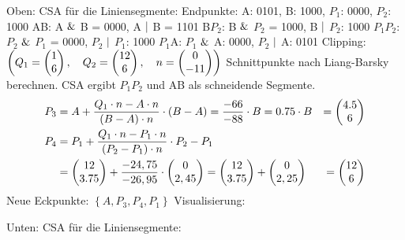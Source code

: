 \documentclass[a4paper,10pt,DIV=14]{article}
\begin{document}
\newpage
Oben: \newline
CSA für die Liniensegmente: \newline
Endpunkte: A: 0101, B: 1000, $P_1$: 0000, $P_2$: 1000 \newline
AB: A $\mathrel{\&}$ B = 0000, A $\mathrel{|}$ B = 1101 \newline
B$P_2$: B $\mathrel{\&}$ $P_2$ = 1000, B $\mathrel{|}$ $P_2$: 1000 \newline
$P_1P_2$: $P_2$ $\mathrel{\&}$ $P_1$ = 0000, $P_2$ $\mathrel{|}$ $P_1$: 1000 \newline
$P_1$A: $P_1$ $\mathrel{\&}$ A: 0000, $P_2$ $\mathrel{|}$ A: 0101 \newline
Clipping: $\left(Q_1= \begin{pmatrix} 1 \\ 6 \end{pmatrix}, \quad Q_2= \begin{pmatrix} 12 \\ 6 \end{pmatrix}, \quad n = \begin{pmatrix} 0 \\ -11 \end{pmatrix} \right)$\newline
Schnittpunkte nach Liang-Barsky berechnen. CSA ergibt $P_1P_2$ und AB als schneidende Segmente.\newline
\begin{align*}
P_3 &= A + \frac{Q_1 \cdot n - A \cdot n}{\left(B-A\right) \cdot n} \cdot \left( B-A\right) = \frac{-66}{-88} \cdot B = 0.75 \cdot B &= \begin{pmatrix} 4.5 \\ 6 \end{pmatrix}
\\
P_4 &= P_1 + \frac{Q_1 \cdot n - P_1 \cdot n}{\left(P_2- P_1\right) \cdot n} \cdot P_2- P_1 \\ &= \begin{pmatrix} 12 \\ 3.75 \end{pmatrix} + \frac{-24,75}{-26,95} \cdot \begin{pmatrix} 0 \\ 2,45 \end{pmatrix} = \begin{pmatrix} 12 \\ 3.75 \end{pmatrix} + \begin{pmatrix} 0 \\ 2,25 \end{pmatrix} &= \begin{pmatrix} 12 \\ 6 \end{pmatrix}
\end{align*}
Neue Eckpunkte: $\left\lbrace A, P_3, P_4, P_1 \right\rbrace $ \newline
Visualisierung: \newline
\begin{center}
\end{center}
\newpage
Unten: \newline
CSA für die Liniensegmente: \newline
\end{document}
